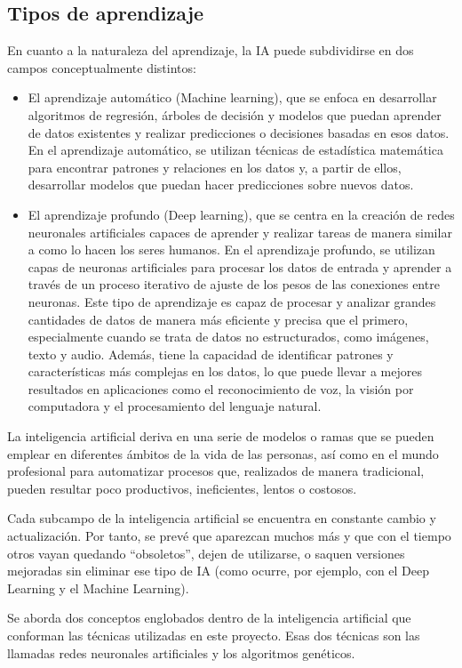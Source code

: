 \subsection{Tipos de aprendizaje}
En cuanto a la naturaleza del aprendizaje, la IA puede subdividirse en dos campos conceptualmente distintos:
\begin{itemize}
\item El aprendizaje automático (Machine learning), que se enfoca en desarrollar algoritmos de regresión, árboles de decisión y modelos que puedan aprender de datos existentes y realizar predicciones o decisiones basadas en esos datos. En el aprendizaje automático, se utilizan técnicas de estadística matemática para encontrar patrones y relaciones en los datos y, a partir de ellos, desarrollar modelos que puedan hacer predicciones sobre nuevos datos.
\item El aprendizaje profundo (Deep learning), que se centra en la creación de redes neuronales artificiales capaces de aprender y realizar tareas de manera similar a como lo hacen los seres humanos. En el aprendizaje profundo, se utilizan capas de neuronas artificiales para procesar los datos de entrada y aprender a través de un proceso iterativo de ajuste de los pesos de las conexiones entre neuronas. Este tipo de aprendizaje es capaz de procesar y analizar grandes cantidades de datos de manera más eficiente y precisa que el primero, especialmente cuando se trata de datos no estructurados, como imágenes, texto y audio. Además, tiene la capacidad de identificar patrones y características más complejas en los datos, lo que puede llevar a mejores resultados en aplicaciones como el reconocimiento de voz, la visión por computadora y el procesamiento del lenguaje natural.
\end{itemize}


La inteligencia artificial deriva en una serie de modelos o ramas que se pueden emplear en diferentes ámbitos de la vida de las personas, así como en el mundo profesional para automatizar procesos que, realizados de manera tradicional, pueden resultar poco productivos, ineficientes, lentos o costosos.

Cada subcampo de la inteligencia artificial se encuentra en constante cambio y actualización. Por tanto, se prevé que aparezcan muchos más y que con el tiempo otros vayan quedando “obsoletos”, dejen de utilizarse, o saquen versiones mejoradas sin eliminar ese tipo de IA (como ocurre, por ejemplo, con el Deep Learning y el Machine Learning).

Se aborda dos conceptos englobados dentro de la inteligencia artificial que conforman las técnicas utilizadas en este proyecto. Esas dos técnicas son las llamadas redes neuronales artificiales y los algoritmos genéticos.

